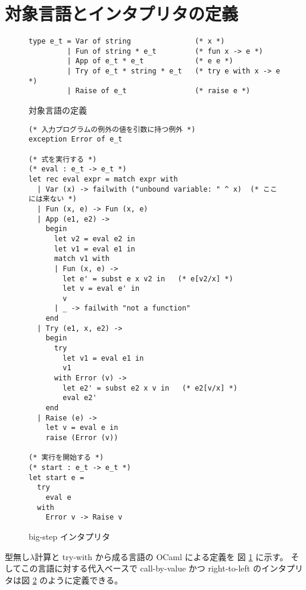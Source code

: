  \section{対象言語とインタプリタの定義}
\label{section:try-with__interpreter}

\begin{figure}
\begin{spacing}{0.8}
\begin{verbatim}
type e_t = Var of string               (* x *)
         | Fun of string * e_t         (* fun x -> e *)
         | App of e_t * e_t            (* e e *)
         | Try of e_t * string * e_t   (* try e with x -> e *)
         | Raise of e_t                (* raise e *)
\end{verbatim}
\end{spacing}
\caption{対象言語の定義}
\label{figure:typee}
\end{figure}

\begin{figure}
\begin{spacing}{0.8}
\begin{verbatim}
(* 入力プログラムの例外の値を引数に持つ例外 *)
exception Error of e_t

(* 式を実行する *)
(* eval : e_t -> e_t *)
let rec eval expr = match expr with
  | Var (x) -> failwith ("unbound variable: " ^ x)  (* ここには来ない *)
  | Fun (x, e) -> Fun (x, e)
  | App (e1, e2) ->
    begin
      let v2 = eval e2 in
      let v1 = eval e1 in
      match v1 with
      | Fun (x, e) ->
        let e' = subst e x v2 in   (* e[v2/x] *)
        let v = eval e' in
        v
      | _ -> failwith "not a function"
    end
  | Try (e1, x, e2) ->
    begin
      try
        let v1 = eval e1 in
        v1
      with Error (v) ->
        let e2' = subst e2 x v in   (* e2[v/x] *)
        eval e2'
    end
  | Raise (e) ->
    let v = eval e in
    raise (Error (v))

(* 実行を開始する *)
(* start : e_t -> e_t *)
let start e =
  try
    eval e
  with
    Error v -> Raise v
\end{verbatim}
\end{spacing}
\caption{big-step インタプリタ}
\label{figure:interpreter}
\end{figure}


型無し$\lambda$計算と try-with から成る言語の OCaml による定義を
図 \ref{figure:typee} に示す。
そしてこの言語に対する代入ベースで call-by-value かつ right-to-left
のインタプリタは図 \ref{figure:interpreter} のように定義できる。

